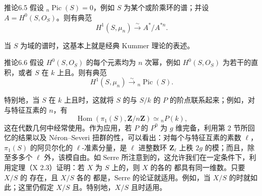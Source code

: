 \begin{SGAresult}{推论}{6.5}
假设 $ {}_n\operatorname{Pic}(S)=0$，例如 $S$ 为某个或阶乘环的谱；并设 $A=H^0(S,O_S)$。则有典范
\[
H^1(S,\mu_n)\xrightarrow{\sim}A^*/A^{*n}.
\]
\end{SGAresult}
当 $S$ 为域的谱时，这基本上就是经典 Kummer 理论的表述。

\begin{SGAresult}{推论}{6.6}
假设 $H^0(S,O_S)$ 的每个元素均为 $n$ 次幂，例如 $H^0(S,O_S)$ 为若干的直积，或者 $S$ 在 $k$ 上且。则有典范
\[
H^1(S,\mu_n)\xrightarrow{\sim}{}_n\operatorname{Pic}(S).
\]
\end{SGAresult}
特别地，当 $S$ 在 $k$ 上且时，这就将 $S$ 的与 $S/k$ 的 $P$ 的阶点联系起来；例如，对与特征互素的 $n$，有
\[
\operatorname{Hom}(\pi_1(S),\mathbf Z/n\mathbf Z)\simeq{}_nP(k),
\]
这在代数几何中经常使用。作为应用，若 $P$ 的 $P^0$ 为 $g$ 维完备，利用第 2 节所回忆的结果以及 Néron–Severi 扭群的性，可以看出：对每个与特征互素的素数 $\ell$， $\pi_1(S)$ 的阿贝尔化的 $\ell$-准素分量，是 $\ell$ 进整数环 $\mathbf Z_\ell$ 上秩 $2g$ 的模；而且，除至多多个 $\ell$ 外，该模自由。如 Serre 所注意到的，这允许我们在一定条件下，利用定理（X 2.3）证明：若 $X$ 为 $S$ 上的，则 $X$ 的各的 都具有同一维数。只要 $X/S$ 的 存在，且 $X/S$ 各的 都是，Serre 的论证就适用。例如，当 $X/S$ 的时就如此；这里仍假定 $X/S$ 且。特别地，$X/S$ 且时适用。

